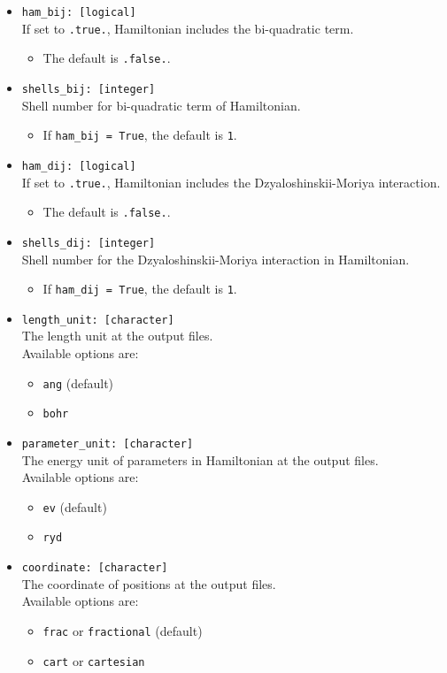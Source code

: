\documentclass[10pt]{report}
\begin{document}
\begin{itemize}
\item {\tt ham\_bij: [logical]}\\
If set to {\tt .true.}, Hamiltonian includes the bi-quadratic term.
\begin{itemize} [label=\adfhalfrightarrowhead]
\item  The default is {\tt .false.}.
\end{itemize}
\item {\tt shells\_bij: [integer]}\\
Shell number for bi-quadratic term of Hamiltonian.
\begin{itemize} [label=\adfhalfrightarrowhead]
\item  If {\tt ham\_bij = True}, the default is {\tt 1}.    
\end{itemize}
\item {\tt ham\_dij: [logical]} \\                   
If set to {\tt .true.}, Hamiltonian includes the Dzyaloshinskii-Moriya interaction.
\begin{itemize} [label=\adfhalfrightarrowhead]
\item  The default is {\tt .false.}.
\end{itemize}
\item {\tt shells\_dij: [integer]}\\
Shell number for the Dzyaloshinskii-Moriya interaction in Hamiltonian.
\begin{itemize} [label=\adfhalfrightarrowhead]
\item  If {\tt ham\_dij = True}, the default is {\tt 1}.    
\end{itemize}
\item {\tt length\_unit: [character]}\\
The length unit at the output files.\\
Available options are:
\begin{itemize} [label=\adfhalfrightarrowhead]
\item {\tt ang} (default)
\item {\tt bohr}        
\end{itemize}
\item {\tt parameter\_unit: [character]}\\
 The energy unit of parameters in Hamiltonian at the output files.\\
 Available options are:
\begin{itemize} [label=\adfhalfrightarrowhead]
\item {\tt ev} (default)
\item {\tt ryd}        
\end{itemize}
\item {\tt coordinate: [character]}\\
The coordinate of positions at the output files. \\
Available options are:
\begin{itemize} [label=\adfhalfrightarrowhead]
\item {\tt frac} or {\tt fractional} (default)
\item {\tt cart} or {\tt cartesian}      
\end{itemize}
\end{itemize}
\end{document}
